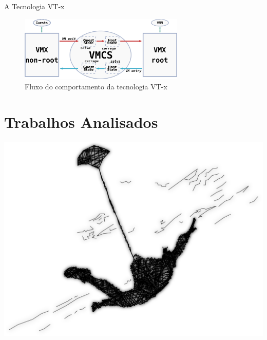 \documentclass[xcolor={usenames,svgnames,dvipsnames},brazil,english,12pt,aspectratio=149]{beamer}
\begin{document}
\begin{frame}{A Tecnologia VT-x}
  \begin{figure}[!h]
    \centering
    \includegraphics[width=0.7\textwidth]{vt-x_flow} 
    \caption*{Fluxo do comportamento da tecnologia VT-x}
  \end{figure}
\end{frame}

\section{Trabalhos Analisados}

\begin{frame}[plain]
  \includegraphics[width=\textwidth]{presentation_cap2_zero}
\end{frame}
\end{document}
